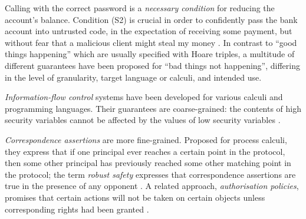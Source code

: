 Calling   with the  correct password is 
a \emph{necessary condition} for reducing the account's  balance.
 Condition   
(S2) is crucial in order to confidently pass the bank account into untrusted code, 
in the expectation of receiving some payment, but without fear
that a malicious client might steal my money \cite{ELang,miller-esop2013}.
%
In contrast to ``good things   happening''  which are usually specified with %
Hoare triples,  a multitude of different guarantees have been proposed for ``bad things  not
happening'', differing in the level 
of granularity,   target  language or calculi, and intended use.

 
 

\emph{Information-flow control}  systems have been developed for
various calculi and programming languages. Their 
 guarantees are coarse-grained:  the contents of high security variables cannot
be affected by the values of low security variables 
\cite{Zdancewic:Myers:01,noninteferenceOS}. 
 
\emph{Correspondence assertions} are more fine-grained. Proposed for 
process calculi, they %
{express}  that if one principal ever reaches a certain point in the protocol, 
then some other principal has previously reached some other matching point in the protocol; 
the term \emph{robust safety}  expresses that correspondence assertions are true in the presence of any opponent %
\cite{correspondence}. 
A related approach,  \emph{authorisation policies}, 
promises that certain actions will not be taken on certain objects
unless corresponding  rights had been granted  \cite{Maffeis:aiamb:thesis00}.

